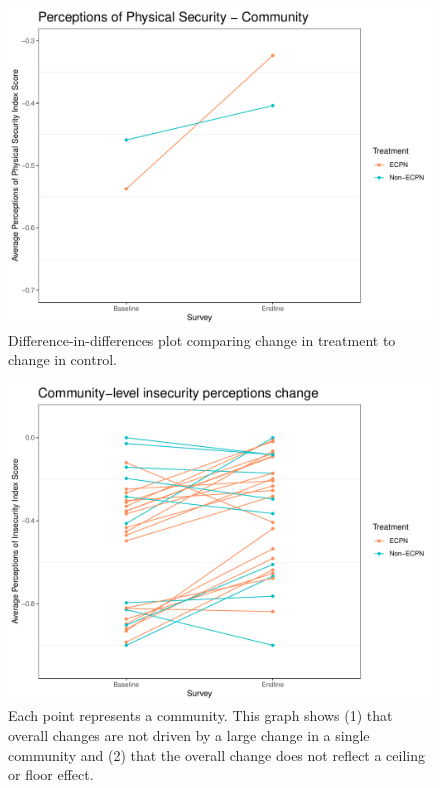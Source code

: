 \documentclass[
]{article}
\begin{document}
\begin{figure}[H]
\centering
\includegraphics[width=\linewidth]{../data_and_code/survey_dat/figs/did_plots/finished_didPlots/inComm_plot.pdf}
\caption{Difference-in-differences plot comparing change in treatment to change in control.}\label{fig:in_comm}
\end{figure}

\begin{figure}[H]
\centering
\includegraphics[width=\linewidth]{../data_and_code/survey_dat/figs/did_plots/inComm_plot_disag.pdf}
\caption{Each point represents a community. This graph shows (1) that overall changes are not driven by a large change in a single community and (2) that the overall change does not reflect a ceiling or floor effect.}\label{fig:in_comm_dis}
\end{figure}
\end{document}
